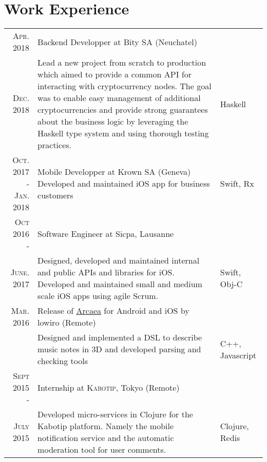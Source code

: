 \documentclass[a4paper,10pt]{article} %
\begin{document}
\section{Work Experience}
\renewcommand{\arraystretch}{1.3}
\begin{tabular}{r|p{9.3cm}|l}
\textsc{Apr. 2018} & Backend Developper at Bity SA (Neuchatel) & \\
\textsc{Dec. 2018} & \footnotesize{Lead a new project from scratch to production which aimed to provide a common API for interacting with cryptocurrency nodes. The goal was to enable easy management of additional cryptocurrencies and provide strong guarantees about the business logic by leveraging the Haskell type system and using thorough testing practices.} & Haskell\\

\makecell[cr]{
	\textsc{Oct. 2017 -} \\
	\textsc{Jan. 2018}
	} & \makecell[cl]{Mobile Developper at Krown SA (Geneva)\\
	    \footnotesize{Developed and maintained iOS app for business customers}}& Swift, Rx\\

\textsc{Oct 2016 -} & Software Engineer at Sicpa, Lausanne\\

\textsc{June. 2017}  
& \footnotesize{Designed, developed and maintained internal and public APIs and libraries for iOS. Developed and maintained small and medium scale iOS apps using agile Scrum.} 
& Swift, Obj-C\\

\textsc{Mar. 2016}  & Release of \href{https://arcaea.lowiro.com}{Arcaea} for Android and iOS by lowiro (Remote)& \\
&  \footnotesize{Designed and implemented a DSL to describe music notes in 3D and developed parsing and checking tools}& C++, Javascript\\


\textsc{Sept 2015 -}& Internship at \textsc{Kabotip}, Tokyo (Remote) \emph{}\\
\textsc{July 2015} & \footnotesize{Developed micro-services in Clojure for the Kabotip platform. Namely the mobile notification service and the automatic moderation tool for user comments.} & Clojure, Redis\\
\end{tabular}

\end{document}
